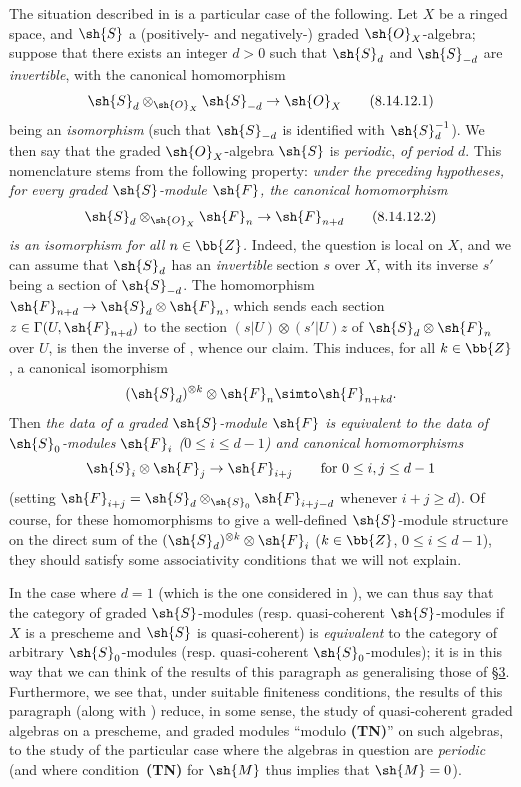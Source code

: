 \begin{remark}[8.14.12]
\label{II.8.14.12}
The situation described in  is a particular case of the following.
Let $X$ be a ringed space, and $\sh{S}$ a (positively- and negatively-) graded $\sh{O}_X$-algebra;
suppose that there exists an integer $d>0$ such that $\sh{S}_d$ and $\sh{S}_{-d}$ are \emph{invertible}, with the canonical homomorphism
\[
\label{II.8.14.12.1}
    \sh{S}_d\otimes_{\sh{O}_X}\sh{S}_{-d} \to \sh{O}_X
\tag{8.14.12.1}
\]
being an \emph{isomorphism} (such that $\sh{S}_{-d}$ is identified with $\sh{S}_d^{-1}$).
We then say that the graded $\sh{O}_X$-algebra $\sh{S}$ is \emph{periodic}, \emph{of period $d$}.
This nomenclature stems from the following property:
\emph{under the preceding hypotheses, for every graded $\sh{S}$-module $\sh{F}$, the canonical homomorphism}
\[
\label{II.8.14.12.2}
    \sh{S}_d\otimes_{\sh{O}_X}\sh{F}_n \to \sh{F}_{n+d}
\tag{8.14.12.2}
\]
\emph{is an isomorphism for all $n\in\bb{Z}$.}
Indeed, the question is local on $X$, and we can assume that $\sh{S}_d$ has an \emph{invertible} section $s$ over $X$, with its inverse $s'$ being a section of $\sh{S}_{-d}$.
The homomorphism $\sh{F}_{n+d}\to\sh{S}_d\otimes\sh{F}_n$, which sends each section $z\in\Gamma(U,\sh{F}_{n+d})$ to the section $(s|U)\otimes(s'|U)z$ of $\sh{S}_d\otimes\sh{F}_n$ over $U$, is then the inverse of , whence our claim.
This induces, for all $k\in\bb{Z}$, a canonical isomorphism
\[
    (\sh{S}_d)^{\otimes k}\otimes\sh{F}_n \simto \sh{F}_{n+kd}.
\]
Then \emph{the data of a graded $\sh{S}$-module $\sh{F}$ is equivalent to the data of $\sh{S}_0$-modules $\sh{F}_i$ ($0\leq i\leq d-1$) and canonical homomorphisms}
\[
    \sh{S}_i\otimes\sh{F}_j \to \sh{F}_{i+j}
    \qquad
    \mbox{for $0\leq i,j\leq d-1$}
\]
(setting $\sh{F}_{i+j}=\sh{S}_d\otimes_{\sh{S}_0}\sh{F}_{i+j-d}$ whenever $i+j\geq d$).
Of course, for these homomorphisms to give a well-defined $\sh{S}$-module structure on the direct sum of the $(\sh{S}_d)^{\otimes k}\otimes\sh{F}_i$ ($k\in\bb{Z}$, $0\leq i\leq d-1$), they should satisfy some associativity conditions that we will not explain.

In the case where $d=1$ (which is the one considered in ), we can thus say that the category of graded $\sh{S}$-modules (resp. quasi-coherent $\sh{S}$-modules if $X$ is a prescheme and $\sh{S}$ is quasi-coherent) is \emph{equivalent} to the category of arbitrary $\sh{S}_0$-modules (resp. quasi-coherent $\sh{S}_0$-modules);
it is in this way that we can think of the results of this paragraph as generalising those of §\hyperref[section:II.3]{3}.
Furthermore, we see that, under suitable finiteness conditions, the results of this paragraph (along with ) reduce, in some sense, the study of quasi-coherent graded algebras on a prescheme, and graded modules ``modulo \textbf{(TN)}'' on such algebras, to the study of the particular case where the algebras in question are \emph{periodic} (and where condition~\textbf{(TN)} for $\sh{M}$  thus implies that $\sh{M}=0$).
\end{remark}

